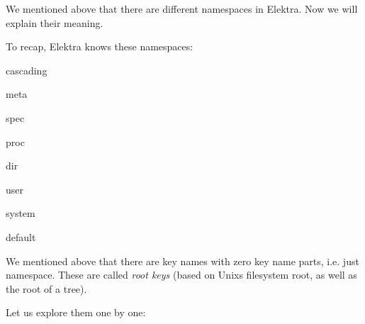 We mentioned above that there are different namespaces in Elektra. Now we will explain their meaning.

To recap, Elektra knows these namespaces\+:


\begin{DoxyItemize}
\item cascading
\item meta
\item spec
\item proc
\item dir
\item user
\item system
\item default
\end{DoxyItemize}

We mentioned above that there are key names with zero key name parts, i.\+e. just namespace. These are called {\itshape root keys} (based on Unix\textquotesingle{}s filesystem root, as well as the root of a tree).

Let us explore them one by one\+:


